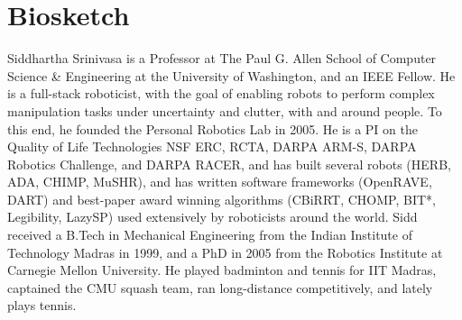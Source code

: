 \documentclass[10pt]{article}
\begin{document}
\section{Biosketch}
\noindent Siddhartha Srinivasa is a Professor at The Paul G. Allen School of Computer Science \& Engineering at the University of Washington, and an IEEE Fellow. He is a full-stack roboticist, with the goal of enabling robots to perform complex manipulation tasks under uncertainty and clutter, with and around people. To this end, he founded the Personal Robotics Lab in 2005. He is a PI on the Quality of Life Technologies NSF ERC, RCTA, DARPA ARM-S, DARPA Robotics Challenge, and DARPA RACER, and has built several robots (HERB, ADA, CHIMP, MuSHR), and has written software frameworks (OpenRAVE, DART) and best-paper award winning algorithms (CBiRRT, CHOMP, BIT*, Legibility, LazySP) used extensively by roboticists around the world. Sidd received a B.Tech in Mechanical Engineering from the Indian Institute of Technology Madras in 1999, and a PhD in 2005 from the Robotics Institute at Carnegie Mellon University. He played badminton and tennis for IIT Madras, captained the CMU squash team, ran long-distance competitively, and lately plays tennis.
\end{document}
